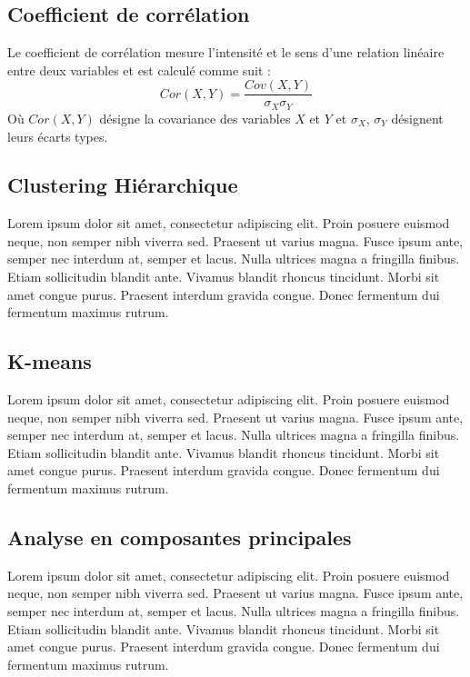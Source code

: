 \subsection{Coefficient de corrélation}
\label{app:correlation}
Le coefficient de corrélation mesure l'intensité et le sens d'une relation linéaire entre deux variables et est calculé comme suit :
\begin{equation*}
    Cor(X,Y) = \frac{Cov(X,Y)}{\sigma_X \sigma_Y}
\end{equation*}
Où $Cor(X,Y)$ désigne la covariance des variables $X$ et $Y$ et $\sigma_X$, $\sigma_Y$ désignent leurs écarts types. 

\subsection{Clustering Hiérarchique}
\label{app:hierarchical-clustering}
Lorem ipsum dolor sit amet, consectetur adipiscing elit. Proin posuere euismod neque, non semper nibh viverra sed. Praesent ut varius magna. Fusce ipsum ante, semper nec interdum at, semper et lacus. Nulla ultrices magna a fringilla finibus. Etiam sollicitudin blandit ante. Vivamus blandit rhoncus tincidunt. Morbi sit amet congue purus. Praesent interdum gravida congue. Donec fermentum dui fermentum maximus rutrum.
\subsection{K-means}
\label{app:k-means}
Lorem ipsum dolor sit amet, consectetur adipiscing elit. Proin posuere euismod neque, non semper nibh viverra sed. Praesent ut varius magna. Fusce ipsum ante, semper nec interdum at, semper et lacus. Nulla ultrices magna a fringilla finibus. Etiam sollicitudin blandit ante. Vivamus blandit rhoncus tincidunt. Morbi sit amet congue purus. Praesent interdum gravida congue. Donec fermentum dui fermentum maximus rutrum.

\subsection{Analyse en composantes principales}
\label{app:pca}
Lorem ipsum dolor sit amet, consectetur adipiscing elit. Proin posuere euismod neque, non semper nibh viverra sed. Praesent ut varius magna. Fusce ipsum ante, semper nec interdum at, semper et lacus. Nulla ultrices magna a fringilla finibus. Etiam sollicitudin blandit ante. Vivamus blandit rhoncus tincidunt. Morbi sit amet congue purus. Praesent interdum gravida congue. Donec fermentum dui fermentum maximus rutrum.

